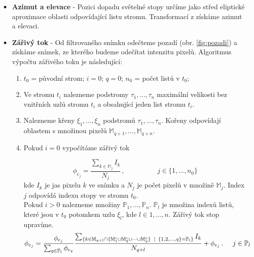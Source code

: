 \begin{itemize}
	\item \textbf{Azimut a elevace} - Pozici dopadu světelné stopy určíme jako střed eliptické aproximace oblasti odpovídající listu stromu. Transformací z \cite{Drapela} získáme azimut a elevaci.
	
	\item \textbf{Zářivý tok} - 
	Od filtrovaného snímku odečteme pozadí (obr. \ref{fig:pozadi}) a získáme snímek, ze kterého budeme odečítat intenzitu pixelů. Algoritmus výpočtu zářivého toku je následující:
	\begin{enumerate}
	\item $t_0$ = původní strom; $i = 0$; $q = 0$; $n_0$ = počet listů v $t_0$;
	
	\item Ve stromu $t_i$ nalezneme podstromy $\tau_1,\dots,\tau_n$ maximální velikosti bez vnitřních uzlů stromu $t_i$ a obsahující jeden list stromu $t_i$.  
	
	\item Nalezneme křeny $\xi_1,\dots,\xi_n$ podstromů $\tau_1,\dots,\tau_n$. Kořeny odpovídají oblastem s množinou pixelů $\mathbb{M}_{q+1},\dots,\mathbb{M}_{q+n}$.
	
	\item Pokud $i = 0$ vypočítáme zářivý tok 
	
	\begin{equation}
	\phi_{e_j} = \frac{\sum_{k\in\mathbb{M}_j} I_k}{N_j}\,,\hspace{2cm} j\in\lbrace1,\dots,n_0\rbrace
	\end{equation}
	kde $I_k$ je jas pixelu $k$ ve snímku a $N_j$ je počet pixelů v množině $\mathbb{M}_j$. Index $j$ odpovídá indexu stopy ve stromu $t_0$.\\
	
	Pokud $i > 0$ nalezneme množiny $\mathbb{P}_1,\dots,\mathbb{P}_n$. $\mathbb{P}_l$ je množina indexů listů, které jsou v $t_0$ potomkem uzlu $\xi_l$, kde $l\in {1,\dots,n}$. Zářivý tok stop upravíme.  
	 \begin{equation}
	\phi_{e_j} = \frac{\phi_{e_j}}{\sum_{q\in \mathbb{P}_l}\phi_{e_q}}\frac{\sum_{\lbrace k\in\mathbb{M}_{q+l}\cap\lbrace \mathbb{M}_1^c \cup \mathbb{M}_2^c \cup \dots \cup \mathbb{M}_q^c \rbrace\hspace{1.5mm}|\hspace{1.5mm} \lbrace1,2,\dots,q\rbrace = \mathbb{P}_l \rbrace} I_k}{N_{q+l}} + \phi_{e_j}\,.\hspace{0.5cm} j\in \mathbb{P}_l
	\end{equation}
	

\end{enumerate}
\end{itemize}
